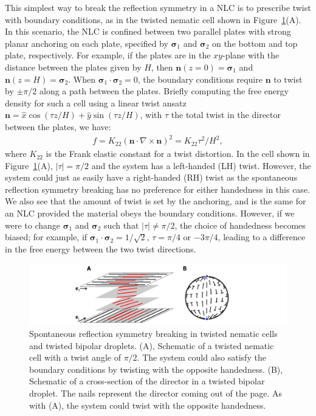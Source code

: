 This simplest way to break the reflection symmetry in a NLC is to prescribe twist with boundary conditions, as in the twisted nematic cell shown in Figure~\ref{f:4-SSB}(A).
In this scenario, the NLC is confined between two parallel plates with strong planar anchoring on each plate, specified by $\bm{\sigma}_1$ and $\bm{\sigma}_2$ on the bottom and top plate, respectively.
For example, if the plates are in the $xy$-plane with the distance between the plates given by $H$, then $\mathbf{n}(z = 0) = \bm{\sigma}_1$ and $\mathbf{n}(z = H) = \bm{\sigma}_2$.
When $\bm{\sigma}_1 \cdot \bm{\sigma}_2 = 0$, the boundary conditions require $\mathbf{n}$ to twist by $\pm \pi/2$ along a path between the plates.
Briefly computing the free energy density for such a cell using a linear twist ansatz $\mathbf{n} = \hat{x} \cos (\tau z/H) + \hat{y} \sin(\tau z/H)$, with $\tau$ the total twist in the director between the plates, we have:
\begin{align}
  f = K_{22}(\mathbf{n} \cdot \nabla \times \mathbf{n})^2 = K_{22}\tau^2/H^2,
\end{align}
where $K_{22}$ is the Frank elastic constant for a twist distortion.
In the cell shown in Figure~\ref{f:4-SSB}(A), $|\tau| = \pi/2$ and the system has a left-handed (LH) twist.
However, the system could just as easily have a right-handed (RH) twist as the spontaneous reflection symmetry breaking has no preference for either handedness in this case.
We also see that the amount of twist is set by the anchoring, and is the same for an NLC provided the material obeys the boundary conditions.
However, if we were to change $\bm{\sigma}_1$ and $\bm{\sigma}_2$ such that $|\tau| \neq \pi/2$, the choice of handedness becomes biased; for example, if $\bm{\sigma}_1 \cdot \bm{\sigma}_2 = 1/\sqrt{2}$, $\tau = \pi/4$ or $-3\pi/4$, leading to a difference in the free energy between the two twist directions.
\begin{figure}
  \centering
  \includegraphics{figures/C4/Ch4-Figs_SSB.png}
  \caption{Spontaneous reflection symmetry breaking in twisted nematic cells and twisted bipolar droplets.
  (A), Schematic of a twisted nematic cell with a twist angle of $\pi/2$.
  The system could also satisfy the boundary conditions by twisting with the opposite handedness.
  (B), Schematic of a cross-section of the director in a twisted bipolar droplet.
  The nails represent the director coming out of the page.
  As with (A), the system could twist with the opposite handedness.}\label{f:4-SSB}
\end{figure}

